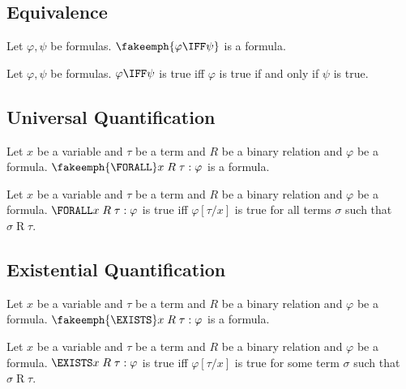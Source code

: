 \documentclass{stex}
\begin{document}
\subsection{Equivalence}\label{sec:equivalence}

\begin{sparagraph}[style=symdoc,for=IFF]
  \begin{signature*}
    Let $\varphi, \psi$ be formulas.
    $\fakeemph{\varphi \IFF \psi}$ is a formula.
  \end{signature*}

  \begin{axiom*}
    Let $\varphi, \psi$ be formulas.
    $\varphi \IFF \psi$ is true iff $\varphi$ is true if and only if $\psi$ is true.
  \end{axiom*}
\end{sparagraph}


\subsection{Universal Quantification}\label{sec:universal-quantification}

\begin{sparagraph}[style=symdoc,for=FORALL]
  \begin{signature*}
    Let $x$ be a variable and $\tau$ be a term and $R$ be a binary relation and $\varphi$ be a formula.
    $\fakeemph{\FORALL} x \mathrel{R} \tau : \varphi$ is a formula.
  \end{signature*}

  \begin{axiom*}
    Let $x$ be a variable and $\tau$ be a term and $R$ be a binary relation and $\varphi$ be a formula.
    $\FORALL x \mathrel{R} \tau : \varphi$ is true iff $\varphi[\tau/x]$ is true for all terms $\sigma$ such that $\sigma \mathrel{R} \tau$.
  \end{axiom*}
\end{sparagraph}


\subsection{Existential Quantification}\label{sec:existential-quantification}

\begin{sparagraph}[style=symdoc,for=EXISTS]
  \begin{signature*}
    Let $x$ be a variable and $\tau$ be a term and $R$ be a binary relation and $\varphi$ be a formula.
    $\fakeemph{\EXISTS} x \mathrel{R} \tau : \varphi$ is a formula.
  \end{signature*}

  \begin{axiom*}
    Let $x$ be a variable and $\tau$ be a term and $R$ be a binary relation and $\varphi$ be a formula.
    $\EXISTS x \mathrel{R} \tau : \varphi$ is true iff $\varphi[\tau/x]$ is true for some term $\sigma$ such that $\sigma \mathrel{R} \tau$.
  \end{axiom*}
\end{sparagraph}


\ifinputref\else{}\fi
\end{document}
